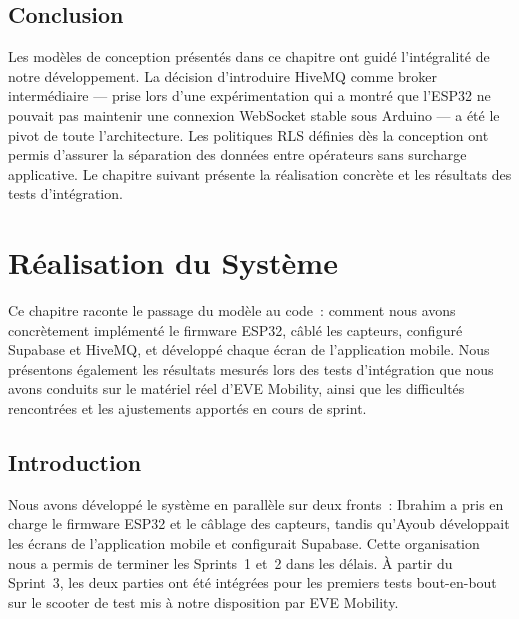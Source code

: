\documentclass[12pt, a4paper]{report}
\begin{document}
\section*{Conclusion}

\begin{chapterconclusion}
Les modèles de conception présentés dans ce chapitre ont guidé l'intégralité de notre
développement. La décision d'introduire HiveMQ comme broker intermédiaire --- prise
lors d'une expérimentation qui a montré que l'ESP32 ne pouvait pas maintenir une
connexion WebSocket stable sous Arduino --- a été le pivot de toute l'architecture.
Les politiques RLS définies dès la conception ont permis d'assurer la séparation des
données entre opérateurs sans surcharge applicative. Le chapitre suivant présente la
réalisation concrète et les résultats des tests d'intégration.
\end{chapterconclusion}

\chapter{Réalisation du Système}

\begin{chapterintro}
Ce chapitre raconte le passage du modèle au code~: comment nous avons concrètement
implémenté le firmware ESP32, câblé les capteurs, configuré Supabase et HiveMQ, et
développé chaque écran de l'application mobile. Nous présentons également les résultats
mesurés lors des tests d'intégration que nous avons conduits sur le matériel réel d'EVE
Mobility, ainsi que les difficultés rencontrées et les ajustements apportés en cours
de sprint.
\end{chapterintro}

\section{Introduction}

Nous avons développé le système en parallèle sur deux fronts~: Ibrahim a pris en charge
le firmware ESP32 et le câblage des capteurs, tandis qu'Ayoub développait les écrans
de l'application mobile et configurait Supabase. Cette organisation nous a permis de
terminer les Sprints~1 et~2 dans les délais. À partir du Sprint~3, les deux parties
ont été intégrées pour les premiers tests bout-en-bout sur le scooter de test mis à
notre disposition par EVE Mobility.
\end{document}
